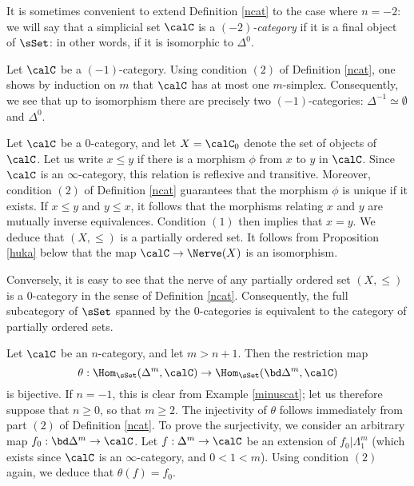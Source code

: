 It is sometimes convenient to extend Definition \ref{ncat} to the case where $n = -2$: we will say that
a simplicial set $\calC$ is a {\it $(-2)$-category} if it is a final object of $\sSet$: in other words, if it is isomorphic to $\Delta^0$.

\begin{example}\label{minuscat}
Let $\calC$ be a $(-1)$-category. Using condition $(2)$ of Definition \ref{ncat}, one shows by induction on $m$ that $\calC$ has at most one $m$-simplex. Consequently, we see that up to isomorphism there are precisely two $(-1)$-categories: $\Delta^{-1} \simeq \emptyset$ and $\Delta^0$.
\end{example}

\begin{example}\label{0catdef}
Let $\calC$ be a $0$-category, and let $X= \calC_0$ denote the set of objects of $\calC$.
Let us write $x \leq y$ if there is a morphism $\phi$ from $x$ to $y$ in $\calC$. Since $\calC$ is an $\infty$-category, this relation is reflexive and transitive. Moreover, condition $(2)$ of Definition \ref{ncat} guarantees that the morphism $\phi$ is unique if it exists. If $x \leq y$ and $y \leq x$, it follows that the morphisms relating $x$ and $y$ are mutually inverse equivalences. Condition $(1)$ then implies that $x = y$. 
We deduce that $(X, \leq)$ is a partially ordered set. It follows from Proposition \ref{huka} below that the map $\calC \rightarrow \Nerve(X)$ is an isomorphism. 

Conversely, it is easy to see that the nerve of any partially ordered set $(X, \leq)$ is a $0$-category in the sense of Definition \ref{ncat}. Consequently, the full subcategory of $\sSet$ spanned by the $0$-categories is equivalent to the category of partially ordered sets.
\end{example}

\begin{remark}\label{slurpper}
Let $\calC$ be an $n$-category, and let $m > n+1$. Then the restriction map 
$$\theta: \Hom_{\sSet}( \Delta^m, \calC) \rightarrow \Hom_{\sSet}( \bd \Delta^m, \calC)$$
is bijective.
If $n=-1$, this is clear from Example \ref{minuscat}; let us therefore suppose that $n \geq 0$, so that $m \geq 2$. The injectivity of $\theta$ follows immediately from part $(2)$ of Definition \ref{ncat}. 
To prove the surjectivity, we consider an arbitrary map $f_0: \bd \Delta^m \rightarrow \calC$.
Let $f: \Delta^m \rightarrow \calC$ be an extension of $f_0 | \Lambda^m_1$ (which exists
since $\calC$ is an $\infty$-category, and $0 < 1 < m$). Using condition $(2)$ again, we
deduce that $\theta(f) = f_0$.
\end{remark}

